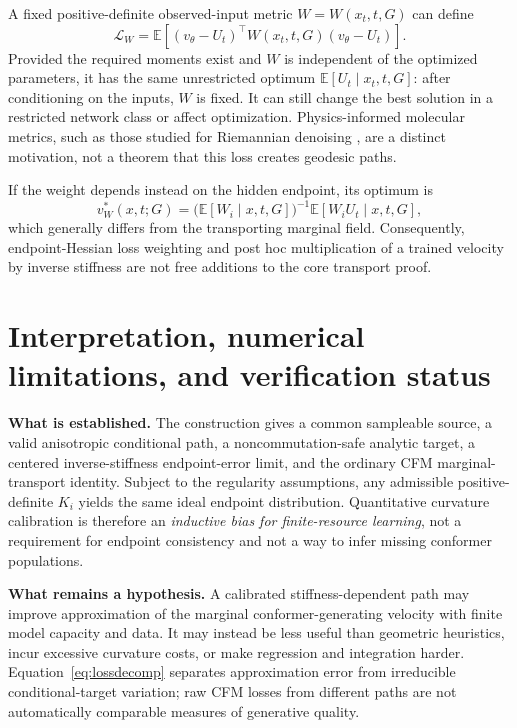 \documentclass[11pt,letterpaper]{article}
\newcommand{\E}{\mathbb E}
\begin{document}
A fixed positive-definite observed-input metric $W=W(x_t,t,G)$ can define
\begin{equation}\label{eq:metric}
\mathcal L_W=\E[(v_\theta-U_t)^\top W(x_t,t,G)(v_\theta-U_t)].
\end{equation}
Provided the required moments exist and $W$ is independent of the optimized parameters, it has the same unrestricted optimum $\E[U_t\mid x_t,t,G]$: after conditioning on the inputs, $W$ is fixed. It can still change the best solution in a restricted network class or affect optimization. Physics-informed molecular metrics, such as those studied for Riemannian denoising \cite{woo}, are a distinct motivation, not a theorem that this loss creates geodesic paths.

If the weight depends instead on the hidden endpoint, its optimum is
\begin{equation}\label{eq:hiddenmetric}
v_W^*(x,t;G)=
\big(\E[W_i\mid x,t,G]\big)^{-1}\E[W_iU_t\mid x,t,G],
\end{equation}
which generally differs from the transporting marginal field. Consequently, endpoint-Hessian loss weighting and post hoc multiplication of a trained velocity by inverse stiffness are not free additions to the core transport proof.

\section{Interpretation, numerical limitations, and verification status}

\textbf{What is established.} The construction gives a common sampleable source, a valid anisotropic conditional path, a noncommutation-safe analytic target, a centered inverse-stiffness endpoint-error limit, and the ordinary CFM marginal-transport identity. Subject to the regularity assumptions, any admissible positive-definite $K_i$ yields the same ideal endpoint distribution. Quantitative curvature calibration is therefore an \emph{inductive bias for finite-resource learning}, not a requirement for endpoint consistency and not a way to infer missing conformer populations.

\textbf{What remains a hypothesis.} A calibrated stiffness-dependent path may improve approximation of the marginal conformer-generating velocity with finite model capacity and data. It may instead be less useful than geometric heuristics, incur excessive curvature costs, or make regression and integration harder. Equation~\eqref{eq:lossdecomp} separates approximation error from irreducible conditional-target variation; raw CFM losses from different paths are not automatically comparable measures of generative quality.
\end{document}
